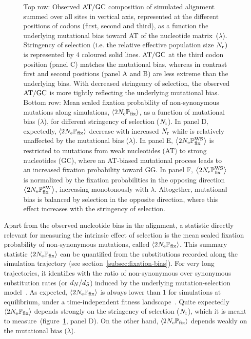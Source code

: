 \documentclass{article}
\begin{document}
\begin{figure}[h]
{ Top row:
 Observed $\text{AT/GC}$ composition of simulated alignment summed over all sites in vertical axis, represented at the different positions of codons (first, second and third), as a function the underlying mutational bias toward AT of the nucleotide matrix~($\lambda$).
 Stringency of selection (i.e. the relative effective population size $N_{\text{r}}$) is represented by 4 coloured solid lines.
 $\text{AT/GC}$ at the third codon position (panel C) matches the mutational bias, whereas in contrast first and second positions (panel A and B) are less extreme than the underlying bias.
 With decreased stringency of selection, the observed $\text{AT/GC}$ is more tightly reflecting the underlying mutational bias.
 Bottom row: Mean scaled fixation probability of non-synonymous mutations along simulations, $\left\langle 2 N_{\text{e}} \mathbb{P}_{\text{fix}} \right\rangle$, as a function of mutational bias ($\lambda$), for different stringency of selection ($N_{\text{r}}$).
 In panel D, expectedly, $\left\langle 2 N_{\text{e}} \mathbb{P}_{\text{fix}} \right\rangle$ decrease with increased $N_{\text{r}}$ while is relatively unaffected by the mutational bias ($\lambda$).
 In panel E, $\left\langle 2 N_{\text{e}} \mathbb{P}_{\text{fix}}^{\text{WS}} \right\rangle$ is restricted to mutations from weak nucleotides (AT) to strong nucleotides (GC), where an AT-biased mutational process leads to an increased fixation probability toward GG.
 In panel F, $\left\langle 2 N_{\text{e}} \mathbb{P}_{\text{fix}}^{\text{WS}} \right\rangle$ is normalized by the fixation probabilities in the opposing direction $\left\langle 2 N_{\text{e}} \mathbb{P}_{\text{fix}}^{\text{SW}} \right\rangle$, increasing monotonously with $\lambda$.
 Altogether, mutational bias is balanced by selection in the opposite direction, where this effect increases with the stringency of selection.
 }
 \label{fig:simu-mut-bias}
\end{figure}

Apart from the observed nucleotide bias in the alignment, a statistic directly relevant for measuring the intrinsic effect of selection is the mean scaled fixation probability of {non-synonymous} mutations, called $\left\langle 2 N_{\text{e}} \mathbb{P}_{\text{fix}} \right\rangle$.
This summary statistic $\left\langle 2 N_{\text{e}} \mathbb{P}_{\text{fix}} \right\rangle$ can be quantified from the {substitutions} recorded along the simulation trajectory (see section~\ref{subsec:fixation-bias}).
For very long trajectories, it identifies with the ratio of {non-synonymous} over {synonymous} {substitution} rates (or $d_N / d_S$) induced by the underlying mutation-selection model~\citep{Spielman2015, DosReis2015, Jones2016}.
As expected, $\left\langle 2 N_{\text{e}} \mathbb{P}_{\text{fix}} \right\rangle$ is always lower than 1 for simulations at equilibrium, under a time-independent fitness landscape~\citep{Spielman2015}.
Quite expectedly $\left\langle 2 N_{\text{e}} \mathbb{P}_{\text{fix}} \right\rangle$ depends strongly on the stringency of selection ($N_{\text{r}}$), which it is meant to measure~(figure~\ref{fig:simu-mut-bias}, panel D).
On the other hand, $\left\langle 2 N_{\text{e}} \mathbb{P}_{\text{fix}} \right\rangle$ depends weakly on the mutational bias ($\lambda$).
\end{document}
